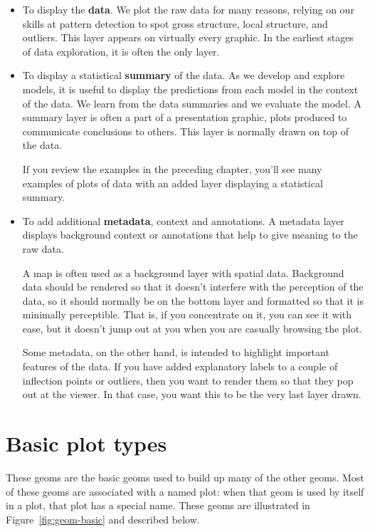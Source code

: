 \begin{itemize}
  \item To display the {\bf data}.  We plot the raw data for many reasons, relying on our skills at pattern detection to spot gross structure, local structure, and outliers.  This layer appears on virtually every graphic.  In the earliest stages of data exploration, it is often the only layer.

  \item To display a statistical {\bf summary} of the data. As we develop and explore models, it is useful to display the predictions from each model in the context of the data. We learn from the data summaries and we evaluate the model. A summary layer is often a part of a presentation graphic, plots produced to communicate conclusions to others. This layer is normally drawn on top of the data.

  If you review the examples in the preceding chapter, you'll see many examples of plots of data with an added layer displaying a statistical summary.

  \item To add additional {\bf metadata}, context and annotations. A metadata layer displays background context or annotations that help to give meaning to the raw data. 
  
  A map is often used as a background layer with spatial data. Background data should be rendered so that it doesn't interfere with the perception of the data, so it should normally be on the bottom layer and formatted so that it is minimally perceptible. That is, if you concentrate on it, you can see it with ease, but it doesn't jump out at you when you are casually browsing the plot.

  Some metadata, on the other hand, is intended to highlight important features of the data. If you have added explanatory labels to a couple of inflection points or outliers, then you want to render them so that they pop out at the viewer. In that case, you want this to be the very last layer drawn.

\end{itemize}


\section{Basic plot types}\label{sec:basics}

These geoms are the basic geoms used to build up many of the other geoms.  Most of these geoms are associated with a named plot: when that geom is used by itself in a plot, that plot has a special name.  These geoms are illustrated in Figure~\ref{fig:geom-basic} and described below.


